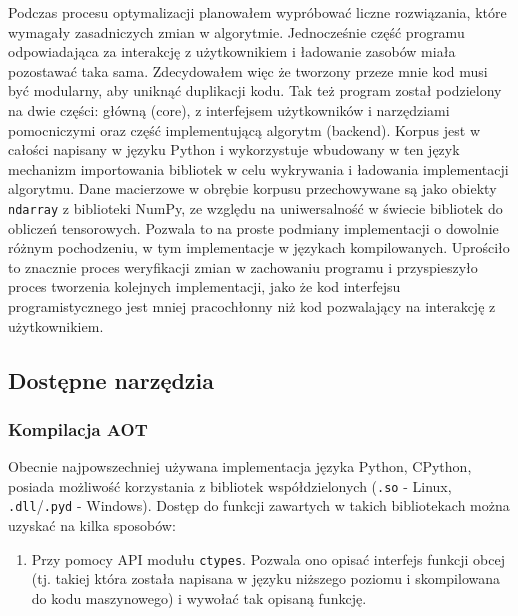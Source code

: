 \documentclass[10pt, a4paper]{article}
\newcommand{\code}[1]{\texttt{#1}}
\begin{document}
\begin{sloppypar}
    Podczas procesu optymalizacji planowałem wypróbować liczne rozwiązania, które
    wymagały zasadniczych zmian w algorytmie. Jednocześnie część programu odpowiadająca za
    interakcję z użytkownikiem i ładowanie zasobów miała pozostawać taka sama.
    Zdecydowałem więc że tworzony przeze mnie kod musi być modularny, aby uniknąć duplikacji
    kodu. Tak też program został podzielony na dwie części: główną (core), z interfejsem
    użytkowników i narzędziami pomocniczymi oraz część implementującą algorytm (backend).
    Korpus jest w całości napisany w języku Python i wykorzystuje wbudowany w ten język mechanizm
    importowania bibliotek w celu wykrywania i ładowania implementacji algorytmu. Dane
    macierzowe w obrębie korpusu przechowywane są jako obiekty \code{ndarray} z biblioteki
    NumPy, ze względu na uniwersalność w świecie bibliotek do obliczeń tensorowych. Pozwala
    to na proste podmiany implementacji o dowolnie różnym pochodzeniu, w tym
    implementacje w językach kompilowanych. Uprościło to znacznie proces weryfikacji zmian
    w zachowaniu programu i przyspieszyło proces tworzenia kolejnych implementacji, jako
    że kod interfejsu programistycznego jest mniej pracochłonny niż kod pozwalający na
    interakcję z użytkownikiem.

    \subsection{Dostępne narzędzia}


    \subsubsection{Kompilacja AOT}



    Obecnie najpowszechniej używana implementacja języka Python, CPython, posiada możliwość
    korzystania z bibliotek współdzielonych (\code{.so} - Linux, \code{.dll}/\code{.pyd}
    - Windows). Dostęp do funkcji zawartych w takich bibliotekach można uzyskać na kilka
    sposobów:

    \begin{enumerate}
      \item Przy pomocy API modułu \code{ctypes}\cite{Python_ctypes}. Pozwala ono opisać
        interfejs funkcji obcej (tj. takiej która została napisana w języku niższego
        poziomu i skompilowana do kodu maszynowego) i wywołać tak opisaną funkcję.


\end{enumerate}
\end{sloppypar}
\end{document}
